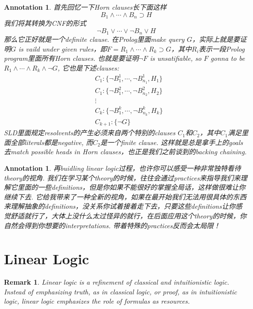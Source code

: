 \documentclass{article}
\theoremstyle{plain}
\newtheorem{remark}[theorem]{Remark}
\newtheorem{annotation}[theorem]{Annotation}
\theoremstyle{nonumberplain}
\begin{document}
\begin{annotation}
\rm 首先回忆一下Horn clauses长下面这样
\[
	B_1 \wedge \cdots \wedge B_n \supset H
\]
我们将其转换为CNF的形式
\[
	\neg B_1 \vee \cdots \vee \neg B_n \vee H
\]
那么它正好就是一个definite clause. 在Prolog里面make query $G$，实际上就是要证明$G$ is vaild under given rules，即$F = R_1\wedge \cdots \wedge R_k \supset G$，其中$R_i$表示一段Prolog program里面所有Horn clauses. 也就是要证明$\neg F$ is unsatifiable,  so $F$ gonna to be $R_1 \wedge \cdots \wedge R_k \wedge \neg G$, 它也是下述clauses:
\[
	\begin{aligned}
	&C_1:\{\neg B_1^1, \cdots, \neg B_{n_1}^1, H_1\} \\
	&C_1:\{\neg B_1^2, \cdots, \neg B_{n_2}^2, H_2\} \\
	&\vdots \\
	&C_k:\{\neg B_1^k, \cdots, \neg B_{n_k}^k, H_k\} \\
	&C_{k+1}: \{\neg G\}
	\end{aligned}
\]
SLD里面规定resolvents的产生必须来自两个特别的clauses $C_1$和$C_2$，其中$C_1$满足里面全部literals都是negative, 而$C_2$是一个finite clause. 这样就是总是拿手上的goals去match possible heads in Horn clauses，也正是我们之前谈到的backing chaining. 
\end{annotation}

\begin{annotation}
\rm 再buidling linear logic过程，也许你可以感受一种非常独特看待theory的视角. 我们在学习某个theory的时候，往往会通过practices来指导我们来理解它里面的一些definitions，但是你如果不能很好的掌握全局话，这样做很难让你继续下去. 它给我带来了一种全新的视角，如果在最开始我们无法用很具体的东西来理解抽象的definitions，没关系你试着接着走下去，只要这些definitions让你感觉舒适就行了，大体上没什么太过怪异的就行，在后面应用这个theory的时候，你自然会得到你想要的interpretations. 带着特殊的practices反而会太局限！
\end{annotation}

\newpage
\section{Linear Logic}

\begin{remark}
\rm \emph{Linear logic is a refinement of classical and intuitionistic logic. Instead of emphasizing truth, as in classical logic, or proof, as in intuitionistic logic, linear logic emphasizes the role of formulas as resources. }
\end{remark}
\end{document}
